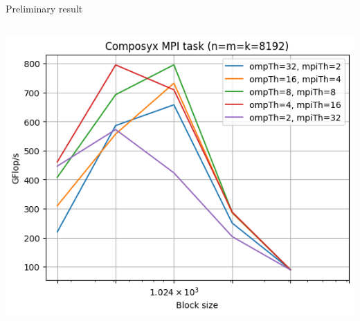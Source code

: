 \documentclass[tikz,presentation,border=10pt]{beamer}
\begin{document}
\begin{frame}{Preliminary result}
\begin{columns}
        \includegraphics[width=\textwidth]{images/composix_hybrid.png}
        
    \end{columns}
\end{frame}
\end{document}
